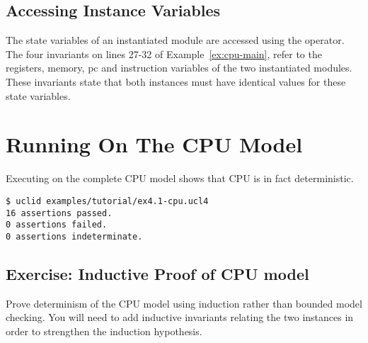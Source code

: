 \subsection{Accessing Instance Variables}
The state variables of an instantiated module are accessed using the \codelike{->} operator. The four invariants on lines 27-32 of Example~\ref{ex:cpu-main}, refer to the registers, memory, pc and instruction variables of the two instantiated modules. These invariants state that both instances must have identical values for these state variables.


\section{Running \uclid{} On The CPU Model}

Executing \uclid{} on the complete CPU model shows that CPU is in fact deterministic. 

\begin{Verbatim}[frame=single, samepage=true]
$ uclid examples/tutorial/ex4.1-cpu.ucl4 
16 assertions passed.
0 assertions failed.
0 assertions indeterminate.
\end{Verbatim}

\subsection{Exercise: Inductive Proof of CPU model}
Prove determinism of the CPU model using induction rather than bounded model checking. You will need to add inductive invariants relating the two instances in order to strengthen the induction hypothesis.
